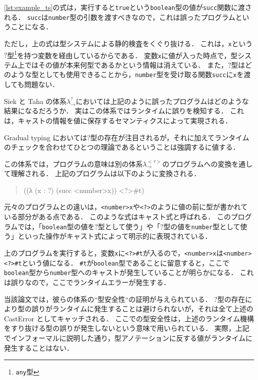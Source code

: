 \ref{lst:example_ts}の式は，実行すると\texttt{true}という\texttt{boolean}型の値が\texttt{succ}関数に渡される．
\texttt{succ}は\texttt{number}型の引数を渡すべきなので，これは誤ったプログラムということになる．

ただし，上の式は型システムによる静的検査をくぐり抜ける．
これは，\texttt{x}という$?$型\footnote{\texttt{any}型}を持つ変数を経由しているからである．
変数\texttt{x}に値が入った時点で，型システム上ではその値が本来何型であるかという情報は消えている．
また，$?$型はどのような型としても使用できることから，\texttt{number}型を受け取る関数\texttt{succ}に\texttt{x}を渡しても問題ない．

Siek と Taha の体系$\lambda^?_\to$においては上記のように誤ったプログラムはどのような結果になるだろうか．
実はこの体系ではランタイムに誤りを検知する．
これは，キャストの情報を値に保存するセマンティクスによって実現される．

Gradual typing においては$?$型の存在が注目されるが，それに加えてランタイムのチェックを合わせてひとつの理論であるということは強調するに値する．

この体系では，プログラムの意味は別の体系$\lambda^{<\tau>}_\to$のプログラムへの変換を通して理解される．
上記のプログラムは以下のように変換される．

\begin{quote}
    ((λ (x : ?) (succ <number>x)) <?>\#t)
\end{quote}

元々のプログラムとの違いは，\texttt{<number>x}や\texttt{<?>}のように値の前に型が書かれている部分がある点である．
このような式はキャスト式と呼ばれる．
このプログラムでは，「\texttt{boolean}型の値を$?$型として使う」や「$?$型の値を\texttt{number}型として使う」といった操作がキャスト式によって明示的に表現されている．

上のプログラムを実行すると，変数\texttt{x}に\texttt{<?>\#t}が入るので，\texttt{<number>x}は\texttt{<number><?>\#t}という値になる．
\texttt{\#t}が\texttt{boolean}型であることに留意すると，ここで\texttt{boolean}型から\texttt{number}型へのキャストが発生していることが明らかになる．
これは誤りなので，ここでランタイムエラーが発生する．

当該論文では，彼らの体系の“型安全性“の証明が与えられている．
$?$型の存在により型の誤りがランタイムに発生することは避けられないが，それは全て上述の CastError としてキャッチされる．
ここでの型安全性は，上述のランタイム機構をすり抜ける型の誤りが発生しないという意味で用いられている．
実際，上記でインフォーマルに説明した通り，型アノテーションに反する値がランタイムに発生することはない．

